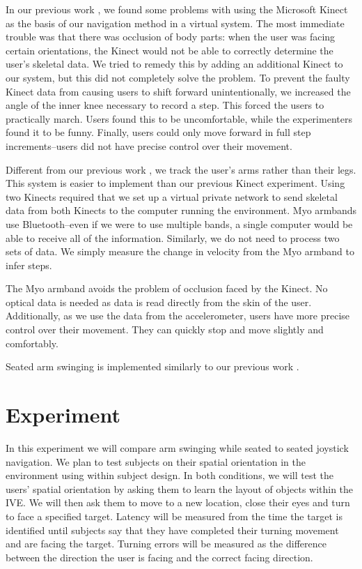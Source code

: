 \documentclass{vgtc}                          %
\begin{document}
In our previous work \cite{Wilson:2014}, we found some problems with using the Microsoft Kinect as the basis
of our navigation method in a virtual system.
The most immediate trouble was that there was occlusion of body parts:
when the user was facing certain orientations,
the Kinect would not be able to correctly determine the user's skeletal data.
We tried to remedy this by adding an additional Kinect to our system,
but this did not completely solve the problem.
To prevent the faulty Kinect data from causing users to shift forward unintentionally,
we increased the angle of the inner knee necessary to record a step.
This forced the users to practically march.
Users found this to be uncomfortable, while the experimenters found it to be funny.
Finally, users could only move forward in full step increments--users did not have precise control over their movement.

Different from our previous work \cite{Williams:2011:EWP},
we track the user's arms rather than their legs.
This system is easier to implement than our previous Kinect experiment.
Using two Kinects required that we set up a virtual private network to send skeletal data from both Kinects
to the computer running the environment.
Myo armbands use Bluetooth--even if we were to use multiple bands,
a single computer would be able to receive all of the information.
Similarly, we do not need to process two sets of data.
We simply measure the change in velocity from the Myo armband to infer steps.

The Myo armband avoids the problem of occlusion faced by the Kinect.
No optical data is needed as data is read directly from the skin of the user.
Additionally, as we use the data from the accelerometer,
users have more precise control over their movement.
They can quickly stop and move slightly and comfortably.

Seated arm swinging is implemented similarly to our previous work \cite{previousMYO}.


\section{Experiment}
In this experiment we will compare arm swinging while seated to seated joystick navigation.
We plan to test subjects on their spatial orientation in the environment using within subject design.
In both conditions, we will test the users' spatial orientation by asking them to learn the layout of objects within the IVE.
We will then ask them to move to a new location, close their eyes and turn to face a specified target.
Latency will be measured from the time the target is identified
until subjects say that they have completed their turning movement and are facing the target.
Turning errors will be measured as the difference between the direction the user is facing and the correct facing direction.
\end{document}
